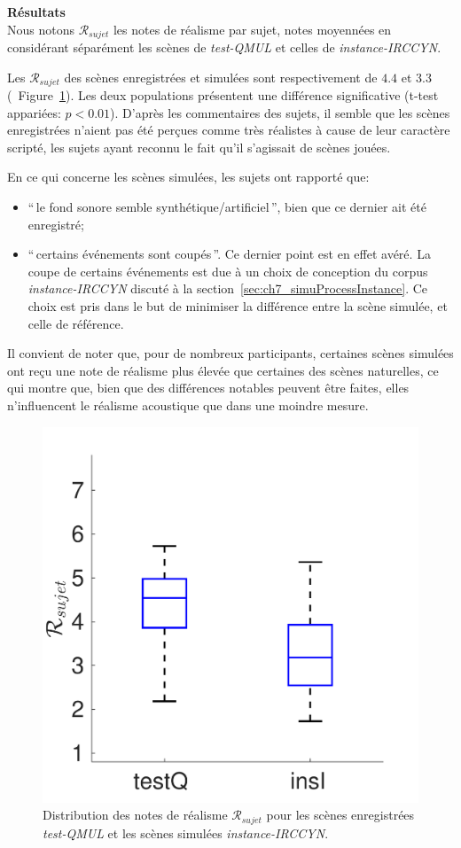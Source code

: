 \textbf{Résultats} \\

Nous notons $\mathcal{R}_{sujet}$ les notes de réalisme par sujet, notes moyennées en considérant séparément les scènes de \emph{test-QMUL} et celles de \emph{instance-IRCCYN}.

Les $\mathcal{R}_{sujet}$ des scènes enregistrées et simulées sont respectivement de $4.4$ et $3.3$ (\cf~Figure~\ref{fig:xpRealism}). Les deux populations présentent une différence significative (t-test appariées: $p<0.01$). D'après les commentaires des sujets, il semble que les scènes enregistrées n'aient pas été perçues comme très réalistes à cause de leur caractère scripté, les sujets ayant reconnu le fait qu'il s'agissait de scènes jouées. 

En ce qui concerne les scènes simulées, les sujets ont rapporté que: 

\begin{itemize}
\item ``\,le fond sonore semble synthétique/artificiel\,'', bien que ce dernier ait été enregistré;
\item ``\,certains événements sont coupés\,''. Ce dernier point est en effet avéré. La coupe de certains événements est due à un choix de conception du corpus \emph{instance-IRCCYN} discuté à la section~\ref{sec:ch7_simuProcessInstance}. Ce choix est pris dans le but de minimiser la différence entre la scène simulée, et celle de référence. 
\end{itemize}

Il convient de noter que, pour de nombreux participants, certaines scènes simulées ont reçu une note de réalisme plus élevée que certaines des scènes naturelles, ce qui montre que, bien que des différences notables peuvent être faites, elles n'influencent le réalisme acoustique que dans une moindre mesure.

\begin{figure}[t]
\begin{center}
\includegraphics[width=.33\textwidth]{gfx/ch_7/xp_realism_2}
\caption{Distribution des notes de réalisme $\mathcal{R}_{sujet}$ pour les scènes enregistrées \emph{test-QMUL} et les scènes simulées \emph{instance-IRCCYN}.}
\label{fig:xpRealism} 
\end{center}
\end{figure}

